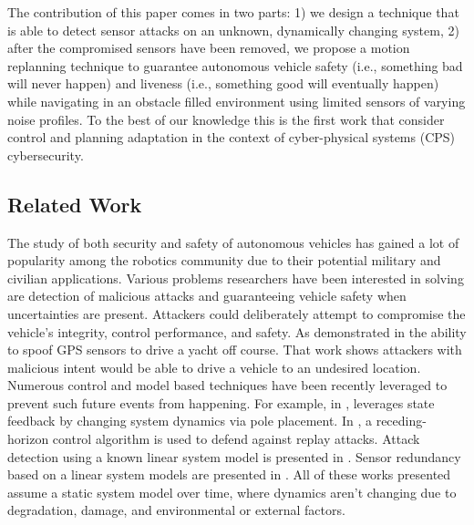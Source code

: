 The contribution of this paper comes in two parts: 1) we design a technique that is able to detect sensor attacks on an unknown, dynamically changing system, 2) after the compromised sensors have been removed, we propose a motion replanning technique to guarantee autonomous vehicle safety (i.e., something bad will never happen) and liveness (i.e., something good will eventually happen) while navigating in an obstacle filled environment using limited sensors of varying noise profiles. 
To the best of our knowledge this is the first work that consider control and planning adaptation in the context of cyber-physical systems (CPS) cybersecurity.






\subsection{Related Work}
\label{sec:Related Work}

The study of both security and safety of autonomous vehicles has gained a lot of popularity among the robotics community due to their potential military and civilian applications. Various problems researchers have been interested in solving are detection of malicious attacks and guaranteeing vehicle safety when uncertainties are present. Attackers could deliberately attempt to compromise the vehicle's integrity, control performance, and safety. As demonstrated in \cite{lee} the ability to spoof GPS sensors to drive a yacht off course. That work shows attackers with malicious intent would be able to drive a vehicle to an undesired location. Numerous control and model based techniques have been recently leveraged to prevent such future events from happening. For example, in \cite{6426811}, leverages state feedback by changing system dynamics via pole placement. In \cite{zhu2012resilient}, a receding-horizon control algorithm is used to defend against replay attacks. Attack detection using a known linear system model is presented in \cite{pasqualetti2013attack}. Sensor redundancy based on a linear system models are presented in \cite{fawzi2014secure,6943080,7330811}. All of these works presented assume a static system model over time, where dynamics aren't changing due to degradation, damage, and environmental or external factors.

